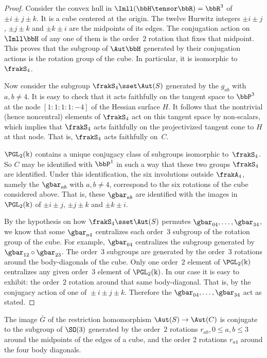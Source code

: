 \begin{proof}
Consider the convex hull in $\Imll(\bbH\tensor\bbR)=\bbR^3$ of $\pm i\pm j\pm k$. It is a cube centered at the origin. The twelve Hurwitz integers $\pm i\pm j$, $\pm j\pm k$ and $\pm k\pm i$ are the midpoints of its edges. The conjugation action on $\Imll\bbH$ of any one of them is the order~$2$ rotation that fixes that midpoint. This proves that the subgroup of $\Aut\bbH$ generated by their conjugation actions is the rotation group of the cube. In particular, it is isomorphic to $\frakS_4$.

Now consider the subgroup $\frakS_4\sset\Aut(S)$ generated by the $g_{ab}$ with $a,b\neq4$. It is easy to check that it acts faithfully on the tangent space to $\bbP^3$ at the node $[1{:}1{:}1{:}1{:}-4]$ of the Hessian surface $H$. It follows that the nontrivial (hence noncentral) elements of $\frakS_4$ act on this tangent space by non-scalars, which implies that $\frakS_4$ acts faithfully on the projectivized tangent cone to $H$ at that node. That is, $\frakS_4$ acts faithfully on~$C$.

$\PGL_2(\Bbbk)$ contains a unique conjugacy class of subgroups isomorphic to~$\frakS_4$. So $C$ may be identified with $\bbP^1$ in such a way that these two groups $\frakS_4$ are identified. Under this identification, the six involutions outside $\frakA_4$, namely the $\gbar_{ab}$ with $a,b\neq4$, correspond to the six rotations of the cube considered above. That is, these $\gbar_{ab}$ are identified with the images in $\PGL_2(\Bbbk)$ of $\pm i\pm j$, $\pm j\pm k$ and $\pm k\pm i$.

By the hypothesis on how $\frakS_4\sset\Aut(S)$ permutes $\gbar_{04},\dots,\gbar_{34}$, we know that some $\gbar_{a4}$ centralizes each order~$3$ subgroup of the rotation group of the cube. For example, $\gbar_{04}$ centralizes the subgroup generated by $\gbar_{12}\circ \gbar_{23}$. The order~$3$ subgroups are generated by the order~$3$ rotations around the body-diagonals of the cube. Only one order~$2$ element of $\PGL_2(\Bbbk)$ centralizes any given order~$3$ element of $\PGL_2(\Bbbk)$. In our case it is easy to exhibit: the order~$2$ rotation around that same body-diagonal. That is, by the conjugacy action of one of ${ }\pm i\pm j\pm k$. Therefore the $\gbar_{04},\dots,\gbar_{34}$ act as stated.
\end{proof}

\begin{coro}\label{tetrahedron}
The image $\bar{G}$ of the restriction homomorphism $\Aut(S)\to \Aut(C)$ is conjugate to the subgroup of $\SO(3)$ generated by the order~$2$ rotations $r_{ab},0\le a,b\le 3$ around the midpoints of the edges of a cube, and the order 2 rotations $r_{a4}$ around the four body diagonals.
\end{coro}

